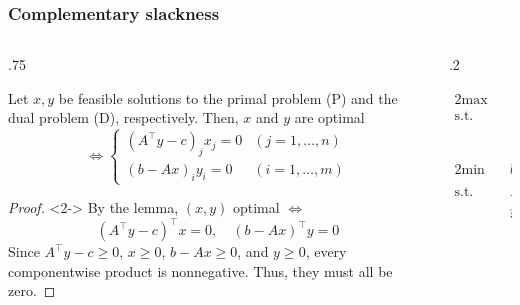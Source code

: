 \documentclass[14pt,aspectratio=169,xcolor=dvipsnames,table,onlytextwidth]{beamer}
\begin{document}
\begin{frame}
    \frametitle{Complementary slackness}

    \small
    \begin{columns}[T]
    \begin{column}{.75\textwidth}
    \begin{theorem}
        Let $x, y$ be feasible solutions to the primal problem (P) and the dual problem (D), respectively. Then, $x$ and $y$ are optimal
        \[ 
            \iff
            \begin{cases}
        (A^\top y - c)_j x_j = 0  & (j = 1, \dots, n) \\
        (b - Ax)_i y_i = 0        & (i = 1, \dots, m)
            \end{cases}
        \]
    \end{theorem}

    \begin{proof}<2->
        By the lemma, $(x, y)$ optimal $\iff$
    \[
            (A^\top y - c)^\top x = 0, \quad (b - Ax)^\top y = 0  
    \]
    Since $A^\top y - c \geq 0$, $x \geq 0$, $b - Ax \geq 0$, and $y \geq 0$, every componentwise product is nonnegative. Thus, they must all be zero.
    \end{proof}
    \end{column}
    \begin{column}{.2\textwidth}
    \footnotesize
    \begin{primal}
        \setlength{\abovedisplayskip}{0pt}
        \begin{alignat*}{2}
            \text{max} & \quad  c^\top x \\
            \text{s.t.} & \quad A x \leq b  \\
            & \quad x \geq 0 
        \end{alignat*}
    \end{primal}
    \begin{dual}
        \setlength{\abovedisplayskip}{0pt}
        \begin{alignat*}{2}
            \text{min} & \quad  b^\top y \\
            \text{s.t.} & \quad A^\top y \geq c  \\
            & \quad y \geq 0 
        \end{alignat*}
    \end{dual}
    \end{column}
    \end{columns}
\end{frame}
\end{document}
